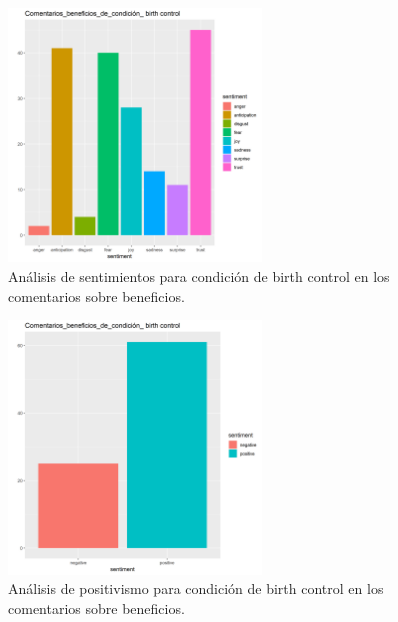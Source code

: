 \documentclass[spanish,]{article}
\begin{document}
\begin{figure}[h]
    \centering
    \includegraphics[width=0.6\textwidth]{figuras/sentimientos/Abirth1.png}
    \caption{Análisis de sentimientos para condición de birth control en los comentarios sobre beneficios.}
    \label{fig:sentimientos:9}
\end{figure}

\begin{figure}[h]
    \centering
    \includegraphics[width=0.6\textwidth]{figuras/sentimientos/Abirth2.png}
    \caption{Análisis de positivismo para condición de birth control en los comentarios sobre beneficios.}
    \label{fig:sentimientos:10}
\end{figure}
\end{document}
